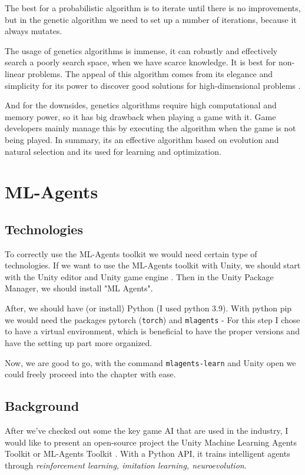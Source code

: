 \documentclass[a4paper, 12pt]{book}
\begin{document}
The best for a probabilistic algorithm is to iterate until there is no improvements, but in the genetic algorithm we need to set up a number of iterations, because it always mutates.

The usage of genetics algorithms is immense, it can robustly and effectively search a poorly search space, when we have scarce knowledge. It is best for non-linear problems. The appeal of this algorithm comes from its elegance and simplicity for its power to discover good solutions for high-dimensional problems \cite{CurrentAIGames}.

And for the downsides, genetics algorithms require high computational and memory power, so it has big drawback when playing a game with it. Game developers mainly manage this by executing the algorithm when the game is not being played. In summary, its an effective algorithm based on evolution and natural selection and its used for learning and optimization.

\chapter{ML-Agents}
\label{ch3}

\section{Technologies}

To correctly use the ML-Agents toolkit we would need certain type of technologies. If we want to use the ML-Agents toolkit with Unity, we should start with the Unity editor and Unity game engine \cite{UnitySoftware}. Then in the Unity Package Manager, we should install "ML Agents".

After, we should have (or install) Python \cite{PythonManual} (I used python 3.9). With python pip we would need the packages pytorch (\texttt{torch}) and \texttt{mlagents} - For this step I chose to have a virtual environment, which is beneficial to have the proper versions and have the setting up part more organized.

Now, we are good to go, with the command \texttt{mlagents-learn} and Unity open we could freely proceed into the chapter with ease.

\section{Background}

After we've checked out some the key game AI that are used in the industry, I would like to present an open-source project the Unity Machine Learning Agents Toolkit or ML-Agents Toolkit \cite{MLAgents}. With a Python \cite{PythonManual} API, it trains intelligent agents through \emph{reinforcement learning, imitation learning, neuroevolution}.
\end{document}
